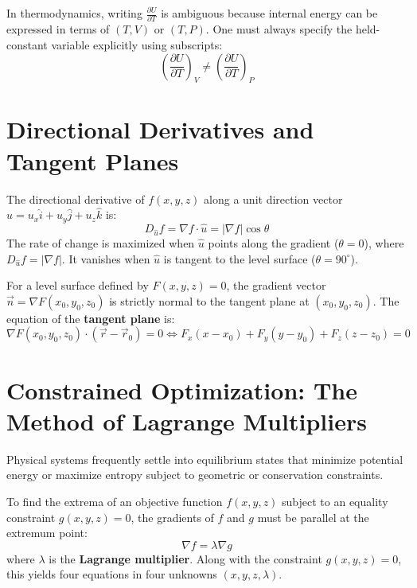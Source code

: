 \begin{pitfallbox}
In thermodynamics, writing $\frac{\partial U}{\partial T}$ is ambiguous because internal energy can be expressed in terms of $(T, V)$ or $(T, P)$. One must always specify the held-constant variable explicitly using subscripts:
\begin{equation}
\left(\frac{\partial U}{\partial T}\right)_V \neq \left(\frac{\partial U}{\partial T}\right)_P
\end{equation}
\end{pitfallbox}

\section{Directional Derivatives and Tangent Planes}
The directional derivative of $f(x, y, z)$ along a unit direction vector $\hat{u} = u_x\hat{i} + u_y\hat{j} + u_z\hat{k}$ is:
\begin{equation}
D_{\hat{u}} f = \nabla f \cdot \hat{u} = |\nabla f|\cos\theta
\end{equation}
The rate of change is maximized when $\hat{u}$ points along the gradient ($\theta = 0$), where $D_{\hat{u}} f = |\nabla f|$. It vanishes when $\hat{u}$ is tangent to the level surface ($\theta = 90^\circ$).

For a level surface defined by $F(x, y, z) = 0$, the gradient vector $\vec{n} = \nabla F(x_0, y_0, z_0)$ is strictly normal to the tangent plane at $(x_0, y_0, z_0)$. The equation of the \textbf{tangent plane} is:
\begin{equation}
\nabla F(x_0, y_0, z_0) \cdot (\vec{r} - \vec{r}_0) = 0 \iff F_x(x - x_0) + F_y(y - y_0) + F_z(z - z_0) = 0
\end{equation}

\section{Constrained Optimization: The Method of Lagrange Multipliers}
Physical systems frequently settle into equilibrium states that minimize potential energy or maximize entropy subject to geometric or conservation constraints.

\begin{maththeorem}
To find the extrema of an objective function $f(x, y, z)$ subject to an equality constraint $g(x, y, z) = 0$, the gradients of $f$ and $g$ must be parallel at the extremum point:
\begin{equation}
\nabla f = \lambda \nabla g
\end{equation}
where $\lambda$ is the \textbf{Lagrange multiplier}. Along with the constraint $g(x, y, z) = 0$, this yields four equations in four unknowns $(x, y, z, \lambda)$.
\end{maththeorem}

